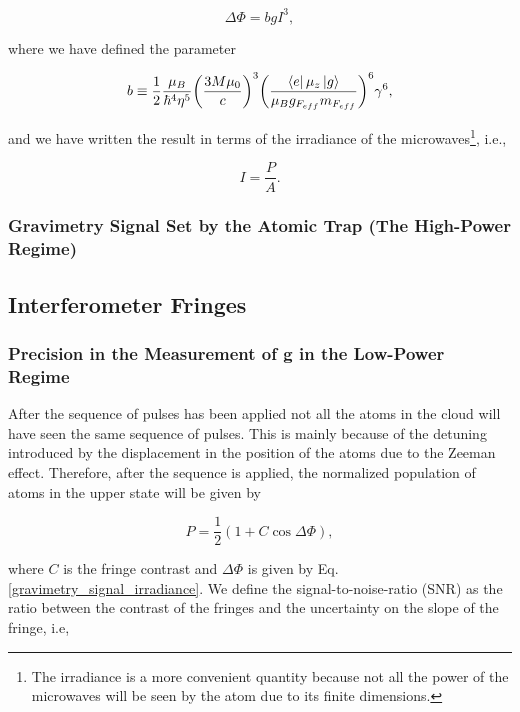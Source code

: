 \documentclass{article}
\begin{document}
\begin{equation}\label{gravimetry_signal_irradiance}
    \Delta \Phi = b g I^3, 
\end{equation}

where we have defined the parameter

\begin{equation}
    b \equiv \frac{1}{2} \frac{ \mu_{B}}{ \hbar^{4} \eta^{5}} \bigg(\frac{3M \mu_{0}}{c} \bigg)^{3} \bigg(\frac{\bra{e} \mu_{z} \ket{g}}{\mu_{B} g_{F_{eff}} m_{F_{eff}}} \bigg)^{6} \gamma^6,
\end{equation}

and we have written the result in terms of the irradiance of the microwaves\footnote{The irradiance is a more convenient quantity because not all the power of the microwaves will be seen by the atom due to its finite dimensions.}, i.e.,

\begin{equation}
    I = \frac{P}{A}.
\end{equation}

\subsubsection{Gravimetry Signal Set by the Atomic Trap (The High-Power Regime)}

\subsection{Interferometer Fringes}
\subsubsection{Precision in the Measurement of g in the Low-Power Regime}
After the sequence of pulses has been applied not all the atoms in the cloud will have seen the same sequence of pulses. This is mainly because of the detuning introduced by the displacement in the position of the atoms due to the Zeeman effect. Therefore, after the sequence is applied, the normalized population of atoms in the upper state will be given by

\begin{equation}\label{fringes_equation}
    P = \frac{1}{2}(1+C\cos{\Delta \Phi}),
\end{equation}

where $C$ is the fringe contrast and $\Delta \Phi$ is given by Eq. \ref{gravimetry_signal_irradiance}. We define the signal-to-noise-ratio (SNR) as the ratio between the contrast of the fringes and the uncertainty on the slope of the fringe, i.e,
\end{document}
